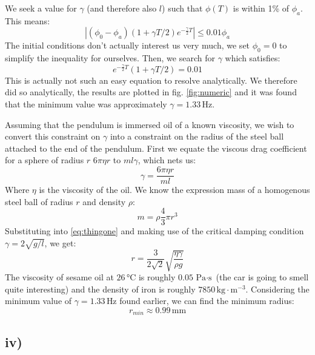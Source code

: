 \documentclass{article}
\begin{document}
We seek a value for $\gamma$ (and therefore also $l$) such that $\phi(T)$ is within 1\% of $\phi_a$. This means:
\begin{equation}
    |(\phi_0 - \phi_a)(1 + \gamma T/2 )e^{-\frac{\gamma}{2}T}| \le 0.01 \phi_a
\end{equation}
The initial conditions don't actually interest us very much, we set $\phi_0 = 0$ to simplify the inequality for ourselves. Then, we search for $\gamma$ which satisfies:
\begin{equation}
    e^{-\frac{\gamma}{2}T}(1 + \gamma T/2) = 0.01
\end{equation}
This is actually not such an easy equation to resolve analytically. We therefore did so analytically, the results are plotted in fig. \ref{fig:numeric} and it was found that the minimum value was approximately $\gamma = 1.33 \,\si{\hertz}$.

Assuming that the pendulum is immersed oil of a known viscosity, we wish to convert this constraint on $\gamma$ into a constraint on the radius of the steel ball attached to the end of the pendulum. First we equate the viscous drag coefficient for a sphere of radius $r$ $6\pi\eta r$ to $m l \gamma$, which nets us:
\begin{equation}
    \gamma = \frac{6\pi \eta r}{m l}
    \label{eq:thingone}
\end{equation}
Where $\eta$ is the viscosity of the oil. We know the expression mass of a homogenous steel ball of radius $r$ and density $\rho$:
\begin{equation}
    m = \rho \frac{4}{3}\pi r^3
\end{equation}
Substituting into \ref{eq:thingone} and making use of the critical damping condition $\gamma = 2\sqrt{g/l}$, we get:
\begin{equation}
    r = \frac{3}{2\sqrt{2}}\sqrt{\frac{\eta \gamma}{\rho g}}
\end{equation}
The viscosity of sesame oil at $26 \,\si{\celsius}$ is roughly $0.05 \,\si{\Pa\cdot\s}$ (the car is going to smell quite interesting) and the density of iron is roughly $7850 \,\si{\kg\cdot \m^{-3}}$. 
Considering the minimum value of $\gamma = 1.33 \,\si{\Hz}$ found earlier, we can find the minimum radius:
\begin{equation*}
    r_{min} \approx 0.99 \,\si{\mm}
\end{equation*}

\subsection*{iv)}
\end{document}
